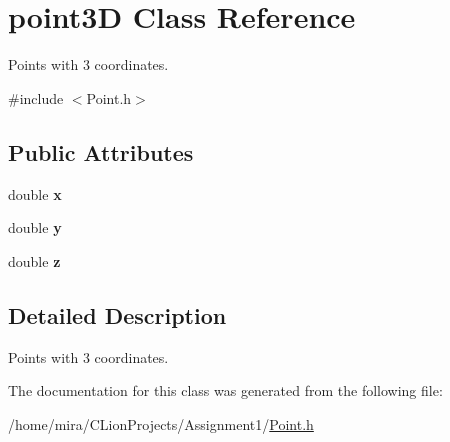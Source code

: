 \hypertarget{classpoint3D}{}\section{point3D Class Reference}
\label{classpoint3D}


Points with 3 coordinates.  




{\ttfamily \#include $<$Point.\+h$>$}

\subsection*{Public Attributes}
\begin{DoxyCompactItemize}
\item 
double {\bfseries x}\hypertarget{classpoint3D_a931445a1beefab42e54ff84f200f53f3}{}\label{classpoint3D_a931445a1beefab42e54ff84f200f53f3}

\item 
double {\bfseries y}\hypertarget{classpoint3D_a78e4b9b1c38c7bec231e428f5c638153}{}\label{classpoint3D_a78e4b9b1c38c7bec231e428f5c638153}

\item 
double {\bfseries z}\hypertarget{classpoint3D_ae7370c9a05b6fb32d54c2b37a8b87d91}{}\label{classpoint3D_ae7370c9a05b6fb32d54c2b37a8b87d91}

\end{DoxyCompactItemize}


\subsection{Detailed Description}
Points with 3 coordinates. 

The documentation for this class was generated from the following file\+:\begin{DoxyCompactItemize}
\item 
/home/mira/\+C\+Lion\+Projects/\+Assignment1/\hyperlink{Point_8h}{Point.\+h}\end{DoxyCompactItemize}
